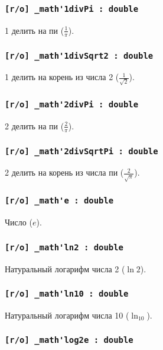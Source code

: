\subsubsection{\lstinline|[r/o] _math'1divPi : double|}

1 делить на пи ($\frac{1}{\pi}$).

\subsubsection{\lstinline|[r/o] _math'1divSqrt2 : double|}

1 делить на корень из числа 2 ($\frac{1}{\sqrt{2}}$).

\subsubsection{\lstinline|[r/o] _math'2divPi : double|}

2 делить на пи ($\frac{2}{\pi}$).

\subsubsection{\lstinline|[r/o] _math'2divSqrtPi : double|}

2 делить на корень из числа пи ($\frac{2}{\sqrt{\pi}}$).

\subsubsection{\lstinline|[r/o] _math'e : double|}

Число ($e$).

\subsubsection{\lstinline|[r/o] _math'ln2 : double|}

Натуральный логарифм числа 2 ($\ln{2}$).

\subsubsection{\lstinline|[r/o] _math'ln10 : double|}

Натуральный логарифм числа 10 ($\ln_{10}$).

\subsubsection{\lstinline|[r/o] _math'log2e : double|}

